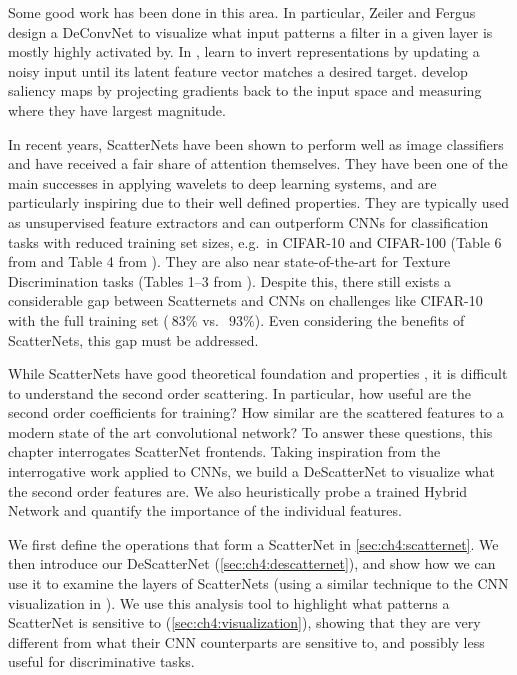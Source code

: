 Some good work has been done in this area. In particular,
Zeiler and Fergus \cite{zeiler_visualizing_2014} 
design a DeConvNet to visualize what input patterns a filter in a given layer is mostly highly
activated by. In \cite{mahendran_understanding_2015},
\citeauthor{mahendran_understanding_2015} learn to invert
representations by updating a noisy input until its latent feature vector
matches a desired target. \cite{simonyan_deep_2014} develop saliency maps by
projecting gradients back to the input space and measuring where they have
largest magnitude.

In recent years, ScatterNets have been shown to perform well as image
classifiers and have received a fair share of attention themselves. They have
been one of the main successes in applying wavelets to
deep learning systems, and are particularly inspiring due to their well defined
properties.  They are typically used as unsupervised feature extractors
\cite{bruna_invariant_2013, oyallon_deep_2015, 
singh_dual-tree_2017, singh_multi-resolution_2016} and 
can outperform CNNs for classification tasks with reduced
training set sizes, e.g.\ in CIFAR-10 and CIFAR-100 (Table 6 from
\cite{oyallon_scaling_2017} and Table 4 from \cite{singh_dual-tree_2017}).  
They are also near state-of-the-art for Texture Discrimination tasks
(Tables 1--3 from \cite{sifre_rotation_2013}). Despite this, there still exists
a considerable gap between Scatternets and CNNs on challenges like CIFAR-10 with the
full training set ($~83\%$ vs.\ $~93\%$). Even considering the benefits of
ScatterNets, this gap must be addressed.

While ScatterNets have good theoretical foundation and properties
\cite{mallat_group_2012}, it is difficult to understand the second order
scattering. In particular, how useful are the second order coefficients for
training? How similar are the scattered features to a modern state of the art
convolutional network? To answer these questions, this chapter interrogates
ScatterNet frontends. Taking inspiration from the interrogative work applied to
CNNs, we build a DeScatterNet to visualize what the second order features are.
We also heuristically probe a trained Hybrid Network and quantify the importance
of the individual features.

We first define the operations that form a ScatterNet in
\autoref{sec:ch4:scatternet}. We then introduce our DeScatterNet
(\autoref{sec:ch4:descatternet}), and show how we can use it to examine the
layers of ScatterNets (using a similar technique to the CNN visualization in
\cite{zeiler_visualizing_2014}). We use this analysis tool to highlight what
patterns a ScatterNet is sensitive to (\autoref{sec:ch4:visualization}), showing
that they are very different from what their CNN counterparts are sensitive to,
and possibly less useful for discriminative tasks. 

